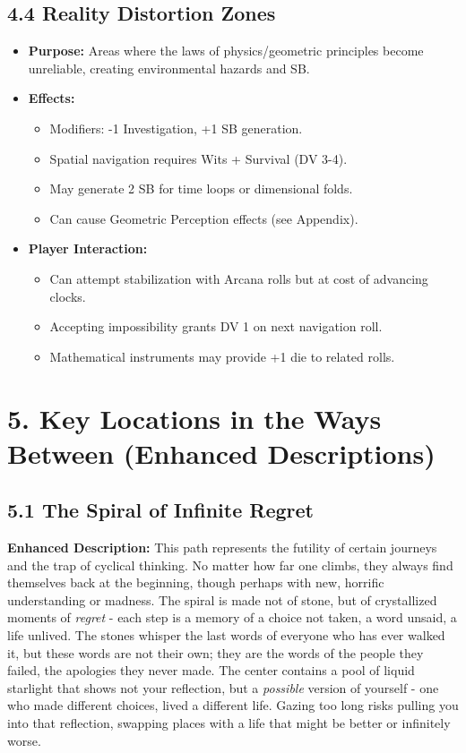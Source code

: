\documentclass[11pt]{article}
\begin{document}
\subsection*{4.4 Reality Distortion Zones}

\begin{itemize}
\item \textbf{Purpose:} Areas where the laws of physics/geometric principles become unreliable, creating environmental hazards and SB.
\item \textbf{Effects:}
\begin{itemize}
\item Modifiers: -1 Investigation, +1 SB generation.
\item Spatial navigation requires Wits + Survival (DV 3-4).
\item May generate 2 SB for time loops or dimensional folds.
\item Can cause Geometric Perception effects (see Appendix).
\end{itemize}
\item \textbf{Player Interaction:}
\begin{itemize}
\item Can attempt stabilization with Arcana rolls but at cost of advancing clocks.
\item Accepting impossibility grants DV 1 on next navigation roll.
\item Mathematical instruments may provide +1 die to related rolls.
\end{itemize}
\end{itemize}

\clearpage

\section*{5. Key Locations in the Ways Between (Enhanced Descriptions)}

\subsection*{5.1 The Spiral of Infinite Regret}

\textbf{Enhanced Description:} This path represents the futility of certain journeys and the trap of cyclical thinking. No matter how far one climbs, they always find themselves back at the beginning, though perhaps with new, horrific understanding or madness. The spiral is made not of stone, but of crystallized moments of \textit{regret} - each step is a memory of a choice not taken, a word unsaid, a life unlived. The stones whisper the last words of everyone who has ever walked it, but these words are not their own; they are the words of the people they failed, the apologies they never made. The center contains a pool of liquid starlight that shows not your reflection, but a \textit{possible} version of yourself - one who made different choices, lived a different life. Gazing too long risks pulling you into that reflection, swapping places with a life that might be better or infinitely worse.
\end{document}
